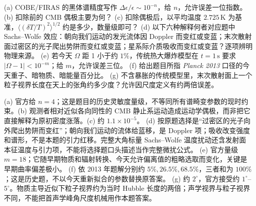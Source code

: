 \begin{exercise}
(a) COBE/FIRAS 的黑体谱精度写作 $\Delta\epsilon/\epsilon\sim10^{-n}$，给 $n$，允许误差一位指数。
(b) 扣除前的 CMB 偶极主要为何？
(c) 扣除偶极后，以平均温度 $2.725\,\mathrm K$ 为基准，$\langle(\delta T/T)^2\rangle^{1/2}$ 约是多少，数量级即可？
(d) 以下六种解释何者对应题中 Sachs--Wolfe 效应：朝向我们运动的发光流体因 Doppler 而变红或变蓝；末次散射面过密区的光子爬出势阱而变红或变蓝；星系际介质吸收而变红或变蓝？逐项辨明物理来源。
(e) 若今天 $\Omega$ 距 1 小于约 $1\%$，传统热大爆炸模型在 $t=1\,\mathrm s$ 要求 $|\Omega-1|<10^{-m}$；给 $m$，允许误差三位。
(f) 给出题目所指 \emph{Planck 2013} 口径的今天重子、暗物质、暗能量百分比。
(g) 不含暴胀的传统模型里，末次散射面上一个粒子视界长度在天上的张角约多少度？允许因尺度定义有约两倍误差。
\end{exercise}
\begin{solution}
(a) 官方给 $n=4$；这是题目的历史灵敏度量级，不等同所有谱畸变参数的现时约束。(b) 观测者相对近似各向同性的 CMB 静止系运动造成运动学偶极，而非把它直接解释为原初密度涨落。(c) 约 $1.1\times10^{-5}$。
(d) 按原题选择是“过密区的光子向外爬出势阱而变红”；朝向我们运动的流体给蓝移，是 Doppler 项；吸收改变强度和谱形，不是本题的引力红移。完整大角标量 Sachs--Wolfe 温度扰动还含发射面本征温度与引力项，不能将选择题口头描述当作完整微扰公式。
(e) 官方量级 $m=18$；它随早期物质和辐射转换、今天允许偏离值的粗略选取而变化，关键是早期曲率偏差极小。
(f) 依 2013 年题解分别约 $5\%,26.5\%,68.5\%$，三者和为 $100\%$；这是历史题，不以今天重新拟合的参数替换原答案。
(g) 约 $2^\circ$，官方接受约 $1^\circ$--$5^\circ$。物质主导近似下粒子视界约为当时 Hubble 长度的两倍；声学视界与粒子视界不同，不能把首声学峰角尺度机械用作本题答案。
\end{solution}
